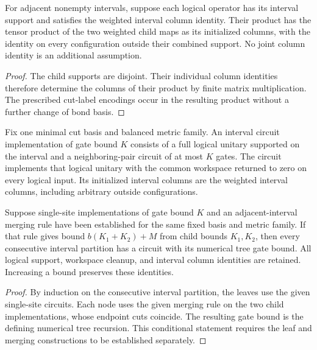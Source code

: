 \begin{lemma}
    \label{thm:mpu_actual_interval_child_columns}
    \leanok
    For adjacent nonempty intervals, suppose each logical operator
    has its interval support and satisfies the weighted interval column
    identity. Their product has the tensor product of the two weighted
    child maps as its initialized columns, with the identity on every
    configuration outside their combined support. No joint column
    identity is an additional assumption.
\end{lemma}
\begin{proof}\leanok
    The child supports are disjoint. Their individual column identities
    therefore determine the columns of their product by finite matrix
    multiplication. The prescribed cut-label encodings occur in the
    resulting product without a further change of bond basis.
\end{proof}

\begin{definition}
    \label{def:mpu_actual_interval_circuit}
    \leanok
    Fix one minimal cut basis and balanced metric family. An interval
    circuit implementation of gate bound $K$ consists of a full logical
    unitary supported on the interval and a neighboring-pair circuit
    of at most $K$ gates. The circuit implements that logical unitary
    with the common workspace returned to zero on every logical
    input. Its initialized interval columns are the weighted
    interval columns, including arbitrary outside configurations.
\end{definition}

\begin{lemma}
    \label{thm:mpu_actual_interval_recursion}
    \leanok
    Suppose single-site implementations of gate bound $K$ and an
    adjacent-interval merging rule have been established for the same
    fixed basis and metric family. If that rule gives bound
    $b(K_1+K_2)+M$ from child bounds $K_1,K_2$, then every consecutive
    interval partition has a circuit with its numerical
    tree gate bound. All logical support, workspace cleanup, and
    interval column identities are retained. Increasing a bound
    preserves these identities.
\end{lemma}
\begin{proof}\leanok
    By induction on the consecutive interval partition, the leaves use the
    given single-site circuits. Each node uses the given merging rule
    on the two child implementations, whose endpoint cuts
    coincide. The resulting gate bound is the defining numerical
    tree recursion. This conditional statement requires the leaf and
    merging constructions to be established separately.
\end{proof}


